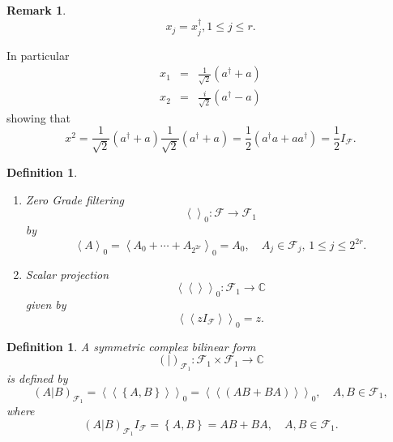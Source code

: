 \documentclass[aps,preprint]{revtex4}
\newtheorem{definition}[theorem]{Definition}
\newtheorem{remark}[theorem]{Remark}
\begin{document}
\begin{remark}
\begin{equation}
x_{j}=x_{j}^{\dagger },1\leq j\leq r.
\end{equation}
\end{remark}

In particular 
\begin{eqnarray}
x_{1} &=&\frac{1}{\sqrt{2}}\left( a^{\dagger }+a\right) \\
x_{2} &=&\frac{i}{\sqrt{2}}\left( a^{\dagger }-a\right)
\end{eqnarray}%
showing that 
\begin{equation}
x^{2}=\frac{1}{\sqrt{2}}\left( a^{\dagger }+a\right) \frac{1}{\sqrt{2}}%
\left( a^{\dagger }+a\right) =\frac{1}{2}\left( a^{\dagger }a+aa^{\dagger
}\right) =\frac{1}{2}I_{\mathcal{F}}.
\end{equation}

\begin{definition}
\begin{enumerate}
\item Zero Grade filtering 
\begin{equation}
\left\langle {}\right\rangle _{0}:\mathcal{F\rightarrow F}_{1}
\end{equation}%
by 
\begin{equation}
\left\langle A\right\rangle _{0}=\left\langle A_{0}+\cdots
+A_{2^{2r}}\right\rangle _{0}=A_{0},\quad A_{j}\in \mathcal{F}_{j},\,1\leq
j\leq 2^{2r}.
\end{equation}

\item Scalar projection 
\begin{equation}
\left\langle \left\langle {}\right\rangle \right\rangle _{0}:\mathcal{F}%
_{1}\rightarrow \mathbb{C}
\end{equation}%
given by 
\begin{equation}
\left\langle \left\langle zI_{\mathcal{F}}\right\rangle \right\rangle _{0}=z.
\end{equation}
\end{enumerate}
\end{definition}

\begin{definition}
A symmetric complex bilinear form 
\begin{equation}
\left( \left. {}\right\vert \right) _{\mathcal{F}_{1}}:\mathcal{F}_{1}\times 
\mathcal{F}_{1}\rightarrow \mathbb{C}
\end{equation}%
is defined by 
\begin{equation}
\left( \left. A\right\vert B\right) _{\mathcal{F}_{1}}=\left\langle
\left\langle \left\{ A,B\right\} \right\rangle \right\rangle
_{0}=\left\langle \left\langle \left( AB+BA\right) \right\rangle
\right\rangle _{0},\quad A,B\in \mathcal{F}_{1},
\end{equation}%
where%
\begin{equation}
\left( \left. A\right\vert B\right) _{\mathcal{F}_{1}}I_{\mathcal{F}%
}=\left\{ A,B\right\} =AB+BA,\quad A,B\in \mathcal{F}_{1}.
\end{equation}
\end{definition}
\end{document}
